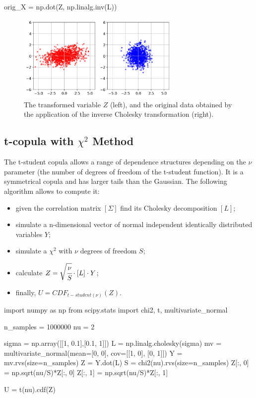 \begin{ipython}
orig_X = np.dot(Z, np.linalg.inv(L))
\end{ipython}

\begin{figure}[htbp]
\centering
\includegraphics[width=0.7\textwidth]{figures/cholesky_inv}
\caption{The transformed variable $Z$ (left), and the original data obtained by the application of the inverse Cholesky transformation (right).}
\label{fig:cholesky_inv}
\end{figure}

\subsection{t-copula with $\chi^2$ Method}

The t-student copula allows a range of dependence structures depending
on the $\nu$ parameter (the number of degrees of freedom of the t-student function).
It is a symmetrical copula and has larger tails than the Gaussian. The following algorithm allows to compute it:
\begin{itemize}
\item given the correlation matrix $[\Sigma]$ find its Cholesky decomposition $[L]$;
\item simulate a n-dimensional vector of normal independent identically distributed variables $Y$;
\item simulate a $\chi^2$ with $\nu$ degrees of freedom $S$;
\item calculate $Z = \sqrt{\cfrac{\nu}{S}}\cdot [L] \cdot Y$;
\item finally, $U = CDF_{t-student(\nu)}(Z)$.
\end{itemize}

\begin{ipython}
import numpy as np
from scipy.stats import chi2, t, multivariate_normal

n_samples = 1000000
nu = 2

sigma = np.array([[1, 0.1],[0.1, 1]])
L = np.linalg.cholesky(sigma)
mv = multivariate_normal(mean=[0, 0], cov=[[1, 0], [0, 1]])
Y = mv.rvs(size=n_samples)
Z = Y.dot(L)
S = chi2(nu).rvs(size=n_samples)
Z[:, 0] = np.sqrt(nu/S)*Z[:, 0]
Z[:, 1] = np.sqrt(nu/S)*Z[:, 1]

U = t(nu).cdf(Z)
\end{ipython}

